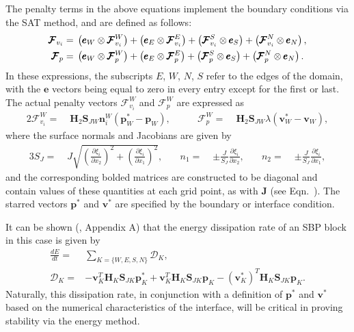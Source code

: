 The penalty terms in the above equations implement the boundary conditions via the
SAT method, and are defined as follows:
\begin{align}
  \pmb{\mathcal{F}}_{v_{i}} =\;&
	\left(  \pmb{e}_{W} \otimes \pmb{\mathcal{F}}^{W}_{v_{i}} \right)
	+ \left(  \pmb{e}_{E} \otimes \pmb{\mathcal{F}}^{E}_{v_{i}} \right)
	+ \left( \pmb{\mathcal{F}}^{S}_{v_{i}} \otimes \pmb{e}_{S} \right)
	+ \left( \pmb{\mathcal{F}}^{N}_{v_{i}} \otimes \pmb{e}_{N} \right),\\
  \pmb{\mathcal{F}}_{p} =\;&
    \left( \pmb{e}_{W} \otimes \pmb{\mathcal{F}}^{W}_{p} \right)
	+ \left( \pmb{e}_{E} \otimes \pmb{\mathcal{F}}^{E}_{p} \right)
	+ \left( \pmb{\mathcal{F}}^{S}_{p} \otimes \pmb{e}_{S} \right)
	+ \left( \pmb{\mathcal{F}}^{N}_{p} \otimes \pmb{e}_{N} \right).
\end{align}
In these expressions, the subscripts $E$, $W$, $N$, $S$ refer to the edges
of the domain, with the $\pmb{e}$ vectors being equal to zero in every entry except
for the first or last. The actual penalty vectors $\pmb{\mathcal{F}}^{W}_{v_{i}}$ and
$\pmb{\mathcal{F}}^{W}_{p}$ are expressed as 
\begin{alignat}{2}
	\pmb{\mathcal{F}}^{W}_{v_{i}} =\;& \pmb{H}_{2} \pmb{S}_{JW} \pmb{n}^{W}_{i}
	\left( \pmb{p}^*_{W} - \pmb{p}_{W} \right),\qquad&
			  \pmb{\mathcal{F}}^{W}_{p} =\;& \pmb{H}_{2}\pmb{S}_{JW}
  \lambda
	\left( \pmb{v}^*_{W} - \pmb{v}_{W} \right),
\end{alignat}
where the surface normals and Jacobians are given by
\begin{alignat}{3}
	S_{J} =\;& J\sqrt{{\left(\frac{\partial \xi_{i}}{\partial x_{2}}\right)}^2 + {\left(\frac{\partial \xi_{i}}{\partial x_{1}}\right)}^2},\quad&
	n_{1} =\;& \pm\frac{J}{S_{J}} \frac{\partial \xi_{i}}{\partial x_{2}},\quad&
	n_{2} =\;& \pm\frac{J}{S_{J}} \frac{\partial \xi_{i}}{\partial x_{1}}, \label{eq:norms_jac}
\end{alignat}
and the corresponding bolded matrices are constructed to be diagonal and contain
values of these quantities at each grid point, as with $\pmb{J}$ (see Eqn.~).
The starred vectors $\pmb{p}^{*}$ and $\pmb{v}^{*}$ are specified by the boundary
or interface condition.

It can be shown (\cite{kozdon2016stable}, Appendix A) that the energy dissipation rate
of an SBP block in this case is given by
\begin{align}
  \frac{dE}{dt} = & \sum_{K = \{W,E,S,N\}} \mathcal{D}_{K},\\
  \mathcal{D}_{K} = &
  - \pmb{v}_{K}^{T}\pmb{H}_{K}\pmb{S}_{JK}\pmb{p}^{*}_{K}
  + \pmb{v}_{K}^{T}\pmb{H}_{K}\pmb{S}_{JK}\pmb{p}_{K}
	- {\left(\pmb{v}^{*}_{K}\right)}^{T}\pmb{H}_{K}\pmb{S}_{JK}\pmb{p}_{K}. \label{eq:sbp_diss}
\end{align}
Naturally, this dissipation rate, in conjunction with a definition of
$\pmb{p}^{*}$ and $\pmb{v}^{*}$ based on the numerical characteristics
of the interface, will be critical in proving stability via the energy
method.

